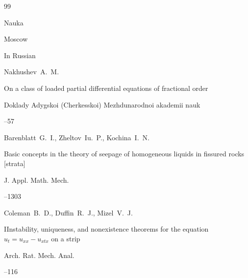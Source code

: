 \begin{thebibliography}{99}

\publ Nauka

\publaddr Moscow











\lang In Russian

\by Nakhushev~A.~M. 

\paper On a class of loaded partial differential equations of fractional order

\jour Doklady Adygskoi (Cherkesskoi) Mezhdunarodnoi akademii nauk




--57










\by Barenblatt~G.~I., Zheltov~Iu.~P., Kochina~I.~N.

\paper Basic concepts in the theory of seepage of homogeneous liquids in fissured rocks [strata]

\jour J. Appl. Math. Mech.




--1303










\by  Coleman~B.~D., Duffin~R.~J., Mizel~V.~J.

\paper IInstability, uniqueness, and nonexistence theorems for the equation $u_t=u_{xx}-u_{xtx}$ on a strip

\jour  Arch. Rat. Mech. Anal.




--116




\end{thebibliography}
